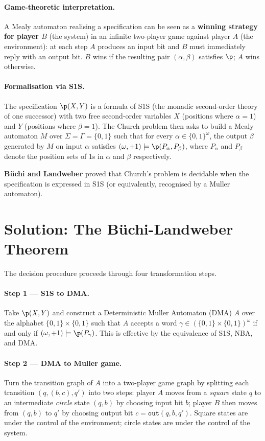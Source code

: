 \documentclass[oneside]{academica}
\begin{document}
\paragraph{Game-theoretic interpretation.}
A Mealy automaton realising a specification can be seen as a \textbf{winning strategy for player $B$} (the system) in an infinite two-player game against player $A$ (the environment): at each step $A$ produces an input bit and $B$ must immediately reply with an output bit. $B$ wins if the resulting pair $(\alpha, \beta)$ satisfies $\p$; $A$ wins otherwise.

\paragraph{Formalisation via S1S.}
The specification $\p(X, Y)$ is a formula of S1S (the monadic second-order theory of one successor) with two free second-order variables $X$ (positions where $\alpha = 1$) and $Y$ (positions where $\beta = 1$). The Church problem then asks to build a Mealy automaton $M$ over $\Sigma = \Gamma = \{0,1\}$ such that for every $\alpha \in \{0,1\}^\omega$, the output $\beta$ generated by $M$ on input $\alpha$ satisfies $(\omega, +1) \models \p(P_\alpha, P_\beta)$, where $P_\alpha$ and $P_\beta$ denote the position sets of $1$s in $\alpha$ and $\beta$ respectively.

\textbf{Büchi and Landweber} proved that Church's problem is decidable when the specification is expressed in S1S (or equivalently, recognised by a Muller automaton).

\section{Solution: The Büchi-Landweber Theorem}

The decision procedure proceeds through four transformation steps.

\paragraph{Step 1 — S1S to DMA.}
Take $\p(X,Y)$ and construct a Deterministic Muller Automaton (DMA) $A$ over the alphabet $\{0,1\} \times \{0,1\}$ such that $A$ accepts a word $\gamma \in (\{0,1\} \times \{0,1\})^\omega$ if and only if $(\omega, +1) \models \p(P_\gamma)$. This is effective by the equivalence of S1S, NBA, and DMA.

\paragraph{Step 2 — DMA to Muller game.}
Turn the transition graph of $A$ into a two-player game graph by splitting each transition $(q, (b,c), q')$ into two steps: player $A$ moves from a \emph{square} state $q$ to an intermediate \emph{circle} state $(q,b)$ by choosing input bit $b$; player $B$ then moves from $(q,b)$ to $q'$ by choosing output bit $c = \mathtt{out}(q,b,q')$. Square states are under the control of the environment; circle states are under the control of the system.
\end{document}
